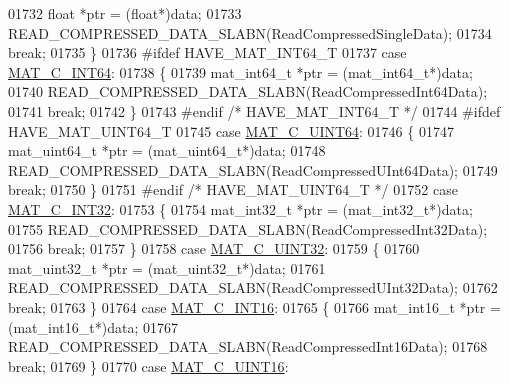\begin{DoxyCode}
{{{{{{{{{01732             \textcolor{keywordtype}{float} *ptr = (\textcolor{keywordtype}{float}*)data;
01733             READ\_COMPRESSED\_DATA\_SLABN(ReadCompressedSingleData);
01734             \textcolor{keywordflow}{break};
01735         \}
01736 \textcolor{preprocessor}{#ifdef HAVE\_MAT\_INT64\_T}
01737         \textcolor{keywordflow}{case} \hyperlink{group___m_a_t_ggad4d60ae7b709fc81bfd744fb4c857c40a1ea83bcde49b35477494412973f82409}{MAT\_C\_INT64}:
01738         \{
01739             mat\_int64\_t *ptr = (mat\_int64\_t*)data;
01740             READ\_COMPRESSED\_DATA\_SLABN(ReadCompressedInt64Data);
01741             \textcolor{keywordflow}{break};
01742         \}
01743 \textcolor{preprocessor}{#endif }\textcolor{comment}{/* HAVE\_MAT\_INT64\_T */}\textcolor{preprocessor}{}
01744 \textcolor{preprocessor}{#ifdef HAVE\_MAT\_UINT64\_T}
01745         \textcolor{keywordflow}{case} \hyperlink{group___m_a_t_ggad4d60ae7b709fc81bfd744fb4c857c40a86470e25c3763d9a24623f04326195dd}{MAT\_C\_UINT64}:
01746         \{
01747             mat\_uint64\_t *ptr = (mat\_uint64\_t*)data;
01748             READ\_COMPRESSED\_DATA\_SLABN(ReadCompressedUInt64Data);
01749             \textcolor{keywordflow}{break};
01750         \}
01751 \textcolor{preprocessor}{#endif }\textcolor{comment}{/* HAVE\_MAT\_UINT64\_T */}\textcolor{preprocessor}{}
01752         \textcolor{keywordflow}{case} \hyperlink{group___m_a_t_ggad4d60ae7b709fc81bfd744fb4c857c40adb44fc39694e3152ae5e69470a2fefe8}{MAT\_C\_INT32}:
01753         \{
01754             mat\_int32\_t *ptr = (mat\_int32\_t*)data;
01755             READ\_COMPRESSED\_DATA\_SLABN(ReadCompressedInt32Data);
01756             \textcolor{keywordflow}{break};
01757         \}
01758         \textcolor{keywordflow}{case} \hyperlink{group___m_a_t_ggad4d60ae7b709fc81bfd744fb4c857c40a9a17a7edd45b19ef68197db81b27e816}{MAT\_C\_UINT32}:
01759         \{
01760             mat\_uint32\_t *ptr = (mat\_uint32\_t*)data;
01761             READ\_COMPRESSED\_DATA\_SLABN(ReadCompressedUInt32Data);
01762             \textcolor{keywordflow}{break};
01763         \}
01764         \textcolor{keywordflow}{case} \hyperlink{group___m_a_t_ggad4d60ae7b709fc81bfd744fb4c857c40a40370e9de516c5036a67a5865c071006}{MAT\_C\_INT16}:
01765         \{
01766             mat\_int16\_t *ptr = (mat\_int16\_t*)data;
01767             READ\_COMPRESSED\_DATA\_SLABN(ReadCompressedInt16Data);
01768             \textcolor{keywordflow}{break};
01769         \}
01770         \textcolor{keywordflow}{case} \hyperlink{group___m_a_t_ggad4d60ae7b709fc81bfd744fb4c857c40a8bede21dbf6c1edc0bbccc1481bccae7}{MAT\_C\_UINT16}:
}}}}}}}}}
\end{DoxyCode}
